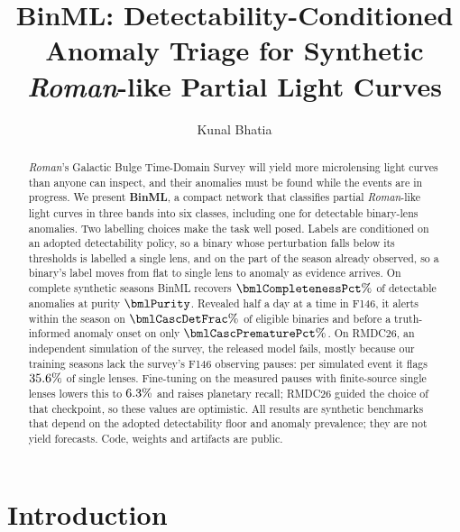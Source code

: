 \documentclass[twocolumn,linenumbers,floatfix,twocolappendix]{aastex701}
\newcommand{\Rom}{\textit{Roman}}
\begin{document}
\title{BinML: Detectability-Conditioned Anomaly Triage for Synthetic \\
\textit{Roman}-like Partial Light Curves}

\author[0009-0007-4447-6325]{Kunal Bhatia}

\begin{abstract}
\Rom{}'s Galactic Bulge Time-Domain Survey will yield more microlensing light curves than anyone can inspect, and
their anomalies must be found while the events are in progress. We present \textbf{BinML}, a compact network that
classifies partial \Rom{}-like light curves in three bands into six classes, including one for detectable
binary-lens anomalies. Two labelling choices make the task well posed. Labels are conditioned on an adopted
detectability policy, so a binary whose perturbation falls below its thresholds is labelled a single lens, and on the
part of the season already observed, so a binary's label moves from flat to single lens to anomaly as evidence
arrives. On complete synthetic seasons BinML recovers $\bmlCompletenessPct\%$ of detectable anomalies at purity
$\bmlPurity$. Revealed half a day at a time in F146, it alerts within the season on $\bmlCascDetFrac\%$ of eligible
binaries and before a truth-informed anomaly onset on only $\bmlCascPrematurePct\%$. On RMDC26, an independent
simulation of the survey, the released model fails, mostly because our training seasons lack the survey's F146
observing pauses: per simulated event it flags $35.6\%$ of single lenses. Fine-tuning on the measured
pauses with finite-source single lenses lowers this to $6.3\%$ and raises planetary recall; RMDC26
guided the choice of that checkpoint, so these values are optimistic. All results are synthetic benchmarks that
depend on the adopted detectability floor and anomaly prevalence; they are not yield forecasts. Code, weights and
artifacts are public.
\end{abstract}


\section{Introduction}\label{sec:intro}
\end{document}

